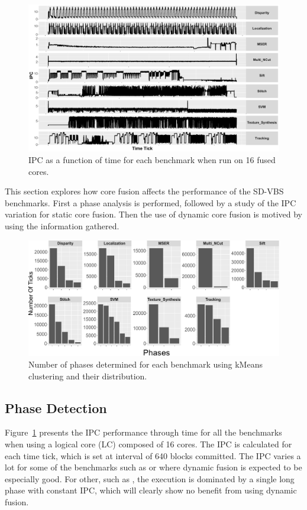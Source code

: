 
\begin{figure}
    \centering
    \includegraphics[width=1\textwidth]{cases-paper/graphics/Exploration/ipcs_16_2.pdf}
    \caption{IPC as a function of time for each benchmark when run on 16 fused cores.}
    \label{fig:sxt}
	\vspace{1em}
\end{figure}

This section explores how core fusion affects the performance of the SD-VBS benchmarks.
First a phase analysis is performed, followed by a study of the IPC variation for static core fusion.
Then the use of dynamic core fusion is motived by using the information gathered.


\begin{figure}[t]
    \centering
    \includegraphics[width=1\textwidth]{cases-paper/graphics/Exploration/clusters3.pdf}
    \caption{Number of phases determined for each benchmark using kMeans clustering and their distribution.}
    \label{fig:clust}
		\vspace{5mm}
\end{figure}


\subsection{Phase Detection}
Figure~\ref{fig:sxt} presents the IPC performance through time for all the benchmarks when using a logical core (LC) composed of 16 cores.
The IPC is calculated for each time tick, which is set at interval of 640 blocks committed.
The IPC varies a lot for some of the benchmarks such as  or  where dynamic fusion is expected to be especially good.
For other, such as , the execution is dominated by a single long phase with constant IPC, which will clearly show no benefit from using dynamic fusion.

